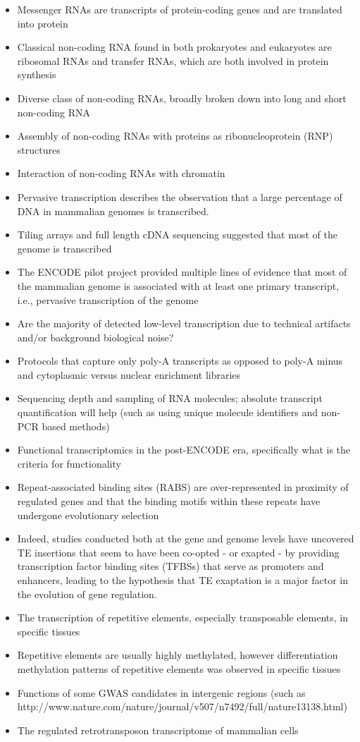 \begin{itemize}
   \item Messenger RNAs are transcripts of protein-coding genes and are translated into protein
   \item Classical non-coding RNA found in both prokaryotes and eukaryotes are ribosomal RNAs and transfer RNAs, which are both involved in protein synthesis
   \item Diverse class of non-coding RNAs, broadly broken down into long and short non-coding RNA
   \item Assembly of non-coding RNAs with proteins as ribonucleoprotein (RNP) structures
   \item Interaction of non-coding RNAs with chromatin
   \item Pervasive transcription describes the observation that a large percentage of DNA in mammalian genomes is transcribed.
   \item Tiling arrays and full length cDNA sequencing suggested that most of the genome is transcribed
   \item The ENCODE pilot project provided multiple lines of evidence that most of the mammalian genome is associated with at least one primary transcript, i.e., pervasive transcription of the genome
   \item Are the majority of detected low-level transcription due to technical artifacts and/or background biological noise?
   \item Protocols that capture only poly-A transcripts as opposed to poly-A minus and cytoplasmic versus nuclear enrichment libraries
   \item Sequencing depth and sampling of RNA molecules; absolute transcript quantification will help (such as using unique molecule identifiers and non-PCR based methods)
   \item Functional transcriptomics in the post-ENCODE era, specifically what is the criteria for functionality
   \item Repeat-associated binding sites (RABS) are over-represented in proximity of regulated genes and that the binding motifs within these repeats have undergone evolutionary selection
   \item Indeed, studies conducted both at the gene and genome levels have uncovered TE insertions that seem to have been co-opted - or exapted - by providing transcription factor binding sites (TFBSs) that serve as promoters and enhancers, leading to the hypothesis that TE exaptation is a major factor in the evolution of gene regulation.
   \item The transcription of repetitive elements, especially transposable elements, in specific tissues
   \item Repetitive elements are usually highly methylated, however differentiation methylation patterns of repetitive elements was observed in specific tissues
   \item Functions of some GWAS candidates in intergenic regions (such as http://www.nature.com/nature/journal/v507/n7492/full/nature13138.html)
   \item The regulated retrotransposon transcriptome of mammalian cells\cite{pmid19377475}
\end{itemize}

